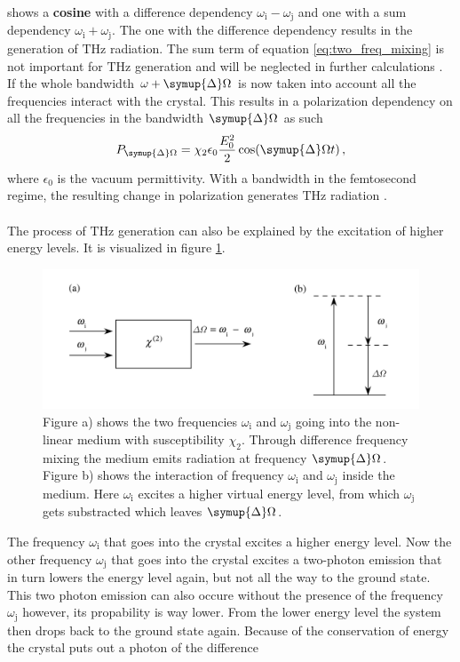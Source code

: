 shows a \textbf{cosine} with a difference dependency $\omega_\text{i}-\omega_\text{j}$ and one with a sum dependency $\omega_\text{i}+\omega_\text{j}$.
The one with the difference dependency results in the generation of $\si{\tera\hertz}$ radiation. %
The sum term of equation \eqref{eq:two_freq_mixing} is not important for $\si{\tera\hertz}$ generation and will be neglected in further calculations \cite{wiki_book}.
If the whole bandwidth $\omega + \symup{\Delta}\Omega$ is now taken into account all the frequencies interact with the crystal.
This results in a polarization dependency on all the frequencies in the bandwidth $\symup{\Delta}\Omega$ as such
\begin{equation}
    P_{\symup{\Delta}\Omega} = \chi_2 \epsilon_0 \frac{E_0^2}{2}\cos(\symup{\Delta}\Omega t) \, ,
    \label{eq:polarization_depens}
\end{equation}
where $\epsilon_0$ is the vacuum permittivity.
With a bandwidth in the femtosecond regime, the resulting change in polarization generates $\si{\tera\hertz}$ radiation \cite{book_optical_rectification}\cite{wiki_book}.
\\\\
The process of $\si{\tera\hertz}$ generation can also be explained by the excitation of higher energy levels.
It is visualized in figure \ref{fig:freq_mix}.
\begin{figure}
    \centering
    \includegraphics[width=\textwidth]{refferenced_pic/diffrence_frequency_mixing.PNG}
    \caption{Figure a) shows the two frequencies $\omega_\text{i} $ and $\omega_\text{j}$ going into the non-linear medium with susceptibility $\chi_2$.
    Through difference frequency mixing the medium emits radiation at frequency $\symup{\Delta}\Omega$.
    Figure b) shows the interaction of frequency $\omega_\text{i} $ and $\omega_\text{j}$ inside the medium.
    Here $\omega_\text{i}$ excites a higher virtual energy level, from which $\omega_\text{j}$ gets substracted which leaves $\symup{\Delta}\Omega$.}
    \label{fig:freq_mix}
\end{figure}
The frequency $\omega_\text{i}$ that goes into the crystal excites a higher energy level.
Now the other frequency $\omega_\text{j}$ that goes into the crystal excites a two-photon emission that in turn lowers the energy level again, but not all the way to the ground state.
This two photon emission can also occure without the presence of the frequency $\omega_\text{j}$ however, its propability is way lower.
From the lower energy level the system then drops back to the ground state again.
Because of the conservation of energy the crystal puts out a photon of the difference

